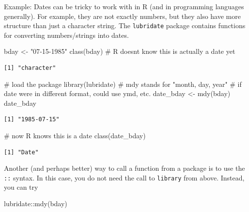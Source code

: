 \documentclass[
  letterpaper,
  DIV=11,
  numbers=noendperiod]{scrreprt}
\newenvironment{Shaded}{\begin{snugshade}}{\end{snugshade}}
\newcommand{\CommentTok}[1]{\textcolor[rgb]{0.37,0.37,0.37}{#1}}
\newcommand{\FunctionTok}[1]{\textcolor[rgb]{0.28,0.35,0.67}{#1}}
\newcommand{\NormalTok}[1]{\textcolor[rgb]{0.00,0.23,0.31}{#1}}
\newcommand{\OtherTok}[1]{\textcolor[rgb]{0.00,0.23,0.31}{#1}}
\newcommand{\SpecialCharTok}[1]{\textcolor[rgb]{0.37,0.37,0.37}{#1}}
\newcommand{\StringTok}[1]{\textcolor[rgb]{0.13,0.47,0.30}{#1}}
\begin{document}
{Example: } Dates can be tricky to work with in R (and in programming
languages generally). For example, they are not exactly numbers, but
they also have more structure than just a character string. The
\texttt{lubridate} package contains functions for converting
numbers/strings into dates.

\begin{Shaded}
\begin{Highlighting}[]
\NormalTok{bday }\OtherTok{\textless{}{-}} \StringTok{"07{-}15{-}1985"}
\FunctionTok{class}\NormalTok{(bday) }\CommentTok{\# R doesn\textquotesingle{}t know this is actually a date yet}
\end{Highlighting}
\end{Shaded}

\begin{verbatim}
[1] "character"
\end{verbatim}

\begin{Shaded}
\begin{Highlighting}[]
\CommentTok{\# load the package}
\FunctionTok{library}\NormalTok{(lubridate)}
\CommentTok{\# mdy stands for "month, day, year"}
\CommentTok{\# if date were in different format, could use ymd, etc.}
\NormalTok{date\_bday }\OtherTok{\textless{}{-}} \FunctionTok{mdy}\NormalTok{(bday)}
\NormalTok{date\_bday}
\end{Highlighting}
\end{Shaded}

\begin{verbatim}
[1] "1985-07-15"
\end{verbatim}

\begin{Shaded}
\begin{Highlighting}[]
\CommentTok{\# now R knows this is a date}
\FunctionTok{class}\NormalTok{(date\_bday)}
\end{Highlighting}
\end{Shaded}

\begin{verbatim}
[1] "Date"
\end{verbatim}

Another (and perhaps better) way to call a function from a package is to
use the \texttt{::} syntax. In this case, you do not need the call to
\texttt{library} from above. Instead, you can try

\begin{Shaded}
\begin{Highlighting}[]
\NormalTok{lubridate}\SpecialCharTok{::}\FunctionTok{mdy}\NormalTok{(bday)}
\end{Highlighting}
\end{Shaded}
\end{document}
